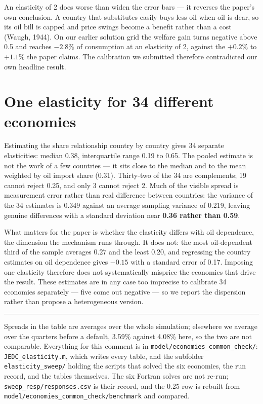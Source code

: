 \documentclass[11pt]{article}
\begin{document}
An elasticity of 2 does worse than widen the error bars --- it reverses the
paper's own conclusion. A country that substitutes easily buys less oil when oil
is dear, so its oil bill is capped and price swings become a benefit rather than
a cost (Waugh, 1944). On our earlier solution grid the welfare gain turns
negative above 0.5 and reaches $-2.8\%$ of consumption at an elasticity of 2,
against the $+0.2\%$ to $+1.1\%$ the paper claims. The calibration we submitted
therefore contradicted our own headline result.

\section*{One elasticity for 34 different economies}

Estimating the share relationship country by country gives 34 separate
elasticities: median 0.38, interquartile range 0.19 to 0.65. The pooled estimate
is not the work of a few countries --- it sits close to the median and to the
mean weighted by oil import share (0.31). Thirty-two of the 34 are complements;
19 cannot reject 0.25, and only 3 cannot reject 2. Much of the visible spread is
measurement error rather than real difference between countries: the variance of
the 34 estimates is 0.349 against an average sampling variance of 0.219, leaving
genuine differences with a standard deviation near \textbf{0.36 rather than
0.59}.

What matters for the paper is whether the elasticity differs with oil
dependence, the dimension the mechanism runs through. It does not: the most
oil-dependent third of the sample averages 0.27 and the least 0.20, and
regressing the country estimates on oil dependence gives $-0.15$ with a standard
error of 0.17. Imposing one elasticity therefore does not systematically
misprice the economies that drive the result. These estimates are in any case
too imprecise to calibrate 34 economies separately --- five come out negative
--- so we report the dispersion rather than propose a heterogeneous version.

\bigskip
\hrule
\bigskip

{\footnotesize
Spreads in the table are averages over the whole simulation; elsewhere we
average over the quarters before a default, 3.59\% against 4.08\% here, so the
two are not comparable. Everything for this comment is in
\texttt{model/economies\_common\_check/}:
\texttt{JEDC\_elasticity.m}, which writes every table, and the subfolder
\texttt{elasticity\_sweep/} holding the scripts that solved the six economies,
the run record, and the tables themselves. The six Fortran
solves are not re-run; \texttt{sweep\_resp/responses.csv} is their record, and
the 0.25 row is rebuilt from
\texttt{model/economies\_common\_check/benchmark} and compared.
\par}

\end{document}
